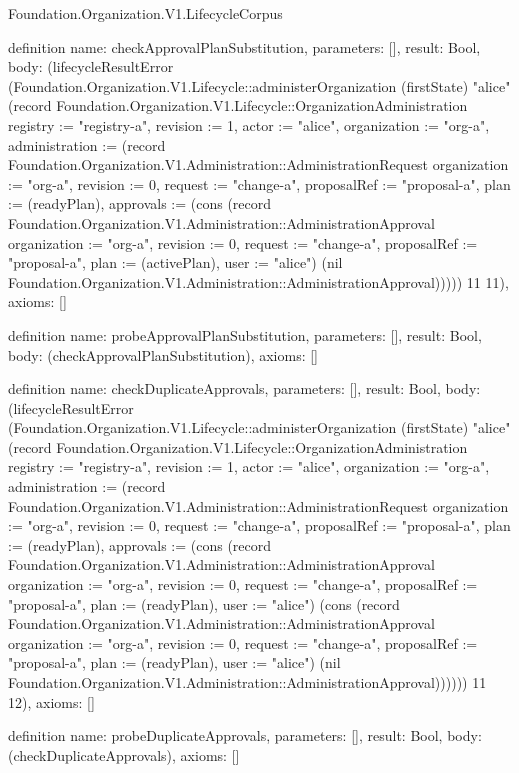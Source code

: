 \begin{lexlean}{Foundation.Organization.V1.LifecycleCorpus}
\begin{semanticmodule}
definition{
  name: checkApprovalPlanSubstitution,
  parameters: [],
  result: Bool,
  body: (lifecycleResultError (Foundation.Organization.V1.Lifecycle::administerOrganization (firstState) "alice" (record Foundation.Organization.V1.Lifecycle::OrganizationAdministration {registry := "registry-a", revision := 1, actor := "alice", organization := "org-a", administration := (record Foundation.Organization.V1.Administration::AdministrationRequest {organization := "org-a", revision := 0, request := "change-a", proposalRef := "proposal-a", plan := (readyPlan), approvals := (cons (record Foundation.Organization.V1.Administration::AdministrationApproval {organization := "org-a", revision := 0, request := "change-a", proposalRef := "proposal-a", plan := (activePlan), user := "alice"}) (nil Foundation.Organization.V1.Administration::AdministrationApproval))})})) 11 11),
  axioms: []
}

definition{
  name: probeApprovalPlanSubstitution,
  parameters: [],
  result: Bool,
  body: (checkApprovalPlanSubstitution),
  axioms: []
}

definition{
  name: checkDuplicateApprovals,
  parameters: [],
  result: Bool,
  body: (lifecycleResultError (Foundation.Organization.V1.Lifecycle::administerOrganization (firstState) "alice" (record Foundation.Organization.V1.Lifecycle::OrganizationAdministration {registry := "registry-a", revision := 1, actor := "alice", organization := "org-a", administration := (record Foundation.Organization.V1.Administration::AdministrationRequest {organization := "org-a", revision := 0, request := "change-a", proposalRef := "proposal-a", plan := (readyPlan), approvals := (cons (record Foundation.Organization.V1.Administration::AdministrationApproval {organization := "org-a", revision := 0, request := "change-a", proposalRef := "proposal-a", plan := (readyPlan), user := "alice"}) (cons (record Foundation.Organization.V1.Administration::AdministrationApproval {organization := "org-a", revision := 0, request := "change-a", proposalRef := "proposal-a", plan := (readyPlan), user := "alice"}) (nil Foundation.Organization.V1.Administration::AdministrationApproval)))})})) 11 12),
  axioms: []
}

definition{
  name: probeDuplicateApprovals,
  parameters: [],
  result: Bool,
  body: (checkDuplicateApprovals),
  axioms: []
}


\end{semanticmodule}
\end{lexlean}
